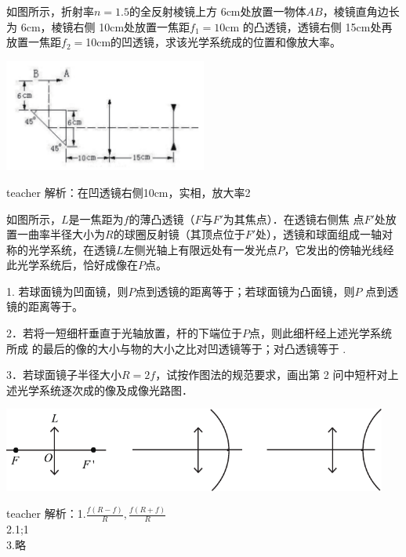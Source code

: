 \begin{example}
	如图所示，折射率$ n=1.5 $的全反射棱镜上方 6cm处放置一物体$AB$，棱镜直角边长为 6cm，棱镜右侧 10cm处放置一焦距$ f_1=10$cm 的凸透镜，透镜右侧 15cm处再放置一焦距$ f_2=$10cm的凹透镜，求该光学系统成的位置和像放大率。
		\begin{flushright}
			\includegraphics[width = 0.5\textwidth]{images/opt-13.pdf} 
		\end{flushright}
	\begin{taggedblock}{teacher}
		\noindent
		解析：在凹透镜右侧10cm，实相，放大率2
	\end{taggedblock}
\end{example}



\begin{example}
如图所示，$L $是一焦距为$ f$的薄凸透镜（$F$与$ F'$为其焦点）．在透镜右侧焦
	点$ F'$处放置一曲率半径大小为$R $的球圈反射镜（其顶点位于$ F'$处），透镜和球面组成一轴对称的光学系统，在透镜$ L $左侧光轴上有限远处有一发光点$ P$，它发出的傍轴光线经此光学系统后，恰好成像在$P $点。
	
	1. 若球面镜为凹面镜，则$P $点到透镜的距离等于\kong；若球面镜为凸面镜，则$P$ 点到透镜的距离等于\kong。
	
	2．若将一短细杆垂直于光轴放置，杆的下端位于$ P$点，则此细杆经上述光学系统所成	的最后的像的大小与物的大小之比对凹透镜等于\kong；对凸透镜等于 \kong.
	
	3．若球面镜子半径大小$ R=2f$，试按作图法的规范要求，画出第 2 问中短杆对上述光学系统逐次成的像及成像光路图．
	
	\begin{center}
		\includegraphics[width=0.95\textwidth]{images/opt-17.pdf}
	\end{center}
	\begin{taggedblock}{teacher}
		\noindent
		解析：1.$\frac{f(R-f)}{R},\frac{f(R+f)}{R}$
		\\2.1;1
		\\3.略
	\end{taggedblock}
\end{example}



